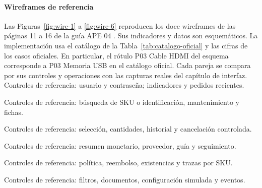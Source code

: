 \clearpage
\paragraph{Wireframes de referencia}
Las Figuras~\ref{fig:wire-1} a \ref{fig:wire-6} reproducen los doce wireframes de las páginas 11 a 16 de la guía APE 04 \cite{ape04}. Sus indicadores y datos son esquemáticos. La implementación usa el catálogo de la Tabla~\ref{tab:catalogo-oficial} y las cifras de los casos oficiales. En particular, el rótulo P03 Cable HDMI del esquema corresponde a P03 Memoria USB en el catálogo oficial. Cada pareja se compara por sus controles y operaciones con las capturas reales del capítulo de interfaz.
 Controles de referencia: usuario y contraseña; indicadores y pedidos recientes.

\clearpage
{} Controles de referencia: búsqueda de SKU o identificación, mantenimiento y fichas.

\clearpage
{} Controles de referencia: selección, cantidades, historial y cancelación controlada.

\clearpage
{} Controles de referencia: resumen monetario, proveedor, guía y seguimiento.

\clearpage
{} Controles de referencia: política, reembolso, existencias y trazas por SKU.

\clearpage
{} Controles de referencia: filtros, documentos, configuración simulada y eventos.



